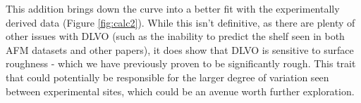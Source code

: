 This addition brings down the curve into a better fit with the experimentally derived data (Figure \ref{fig:calc2}). While this isn't definitive, as there are plenty of other issues with DLVO (such as the inability to predict the shelf seen in both AFM datasets and other papers), it does show that DLVO is sensitive to surface roughness - which we have previously proven to be significantly rough. This trait that could potentially be responsible for the larger degree of variation seen between experimental sites, which could be an avenue worth further exploration.


